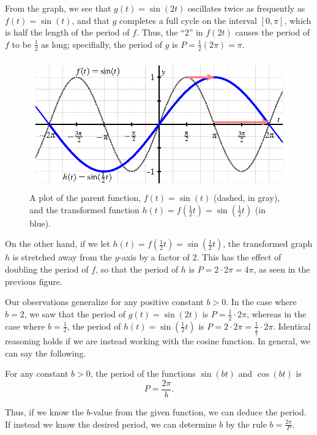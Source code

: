 \documentclass{ximera}
\begin{document}
From the graph, we see that \(g(t) = \sin(2t)\) oscillates twice as frequently as \(f(t) = \sin(t)\), and that \(g\) completes a full cycle on the interval \([0,\pi]\), which is half the length of the period of \(f\).  Thus, the  ``\(2\)'' in \(f(2t)\) causes the period of \(f\) to be \(\frac{1}{2}\) as long; specifially, the period of \(g\) is \(P = \frac{1}{2} (2\pi) = \pi\).%
\begin{figure}
\centering
\includegraphics[width=0.75\linewidth]{images/sinusoidal-sine-horiz-scaling-2.png}
\caption{A plot of the parent function, \(f(t) = \sin(t)\) (dashed, in gray), and the transformed function \(h(t) = f(\frac{1}{2}t) = \sin(\frac{1}{2}t)\) (in blue).\label{F-sinusoidal-sine-stretched}}
\end{figure}

On the other hand, if we let \(h(t) = f(\frac{1}{2}t) = \sin(\frac{1}{2}t)\), the transformed graph \(h\) is stretched away from the \(y\)-axis by a factor of \(2\).  This has the effect of doubling the period of \(f\), so that the period of \(h\) is \(P = 2 \cdot 2\pi = 4\pi\), as seen in the previous figure.%

Our observations generalize for any positive constant \(b \gt 0\).  In the case where \(b = 2\), we saw that the period of \(g(t) = \sin(2t)\) is \(P = \frac{1}{2} \cdot 2\pi\), whereas in the case where \(b = \frac{1}{2}\), the period of \(h(t) = \sin(\frac{1}{2}t)\) is \(P = 2 \cdot 2\pi = \frac{1}{\frac{1}{2}} \cdot 2\pi\).  Identical reasoning holds if we are instead working with the cosine function.  In general, we can say the following.%

For any constant \(b \gt 0\), the period of the functions \(\sin(bt)\) and \(\cos(bt)\) is%
\[
P = \frac{2\pi}{b}\text{.}
\]
%

Thus, if we know the \(b\)-value from the given function, we can deduce the period.  If instead we know the desired period, we can determine \(b\) by the rule \(b = \frac{2\pi}{P}\).%
\end{document}
